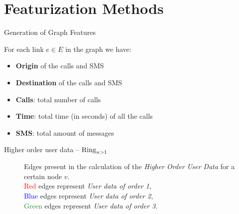 \documentclass[usenames,dvipsnames]{beamer}
\begin{document}
\section{Featurization Methods}


\begin{frame}{Generation of Graph Features}

For each link $e \in E$ in the graph we have:

\begin{itemize}
	\item \textbf{Origin} of the calls and SMS
	\item \textbf{Destination} of the calls and SMS
	\item \textbf{Calls}: total number of calls
	\item \textbf{Time}: total time (in seconds) of all the calls
	\item \textbf{SMS}: total amount of messages
\end{itemize}

\end{frame}


\begin{frame}{Higher order user data -- $\operatorname{Ring}_{n > 1}$ }

\begin{figure}
\centering
\framebox[\columnwidth]{%
	
}
\caption{Edges present in the calculation of the \emph{Higher Order User Data} for a certain node $v$. \\
\textcolor{red}{Red} edges represent \emph{User data of order 1},\\
 \textcolor{blue}{Blue} edges represent \emph{User data of order 2}, \\
 \textcolor{ForestGreen}{Green} edges represent \emph{User data of order 3}.}
\label{fig:higherorderuserdata}
\end{figure}


\end{frame}
\end{document}
